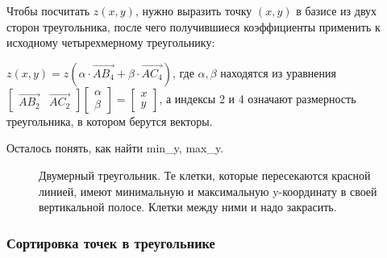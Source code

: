 \documentclass{article}
\begin{document}
Чтобы посчитать $z(x, y)$, нужно выразить точку $(x, y)$ в базисе из двух сторон треугольника, после чего получившиеся коэффициенты применить к исходному четырехмерному треугольнику:

$z(x, y) = z(\alpha \cdot \vec{AB_4} + \beta \cdot \vec{AC_4})$, где $\alpha, \beta$ находятся из уравнения $\begin{bmatrix}\vec{AB_2} & \vec{AC_2} \end{bmatrix} \begin{bmatrix} \alpha \\ \beta \end{bmatrix} = \begin{bmatrix} x \\ y \end{bmatrix}$, а индексы 2 и 4 означают размерность треугольника, в котором берутся векторы.


Осталось понять, как найти min\_y, max\_y.

\begin{center}
\begin{figure}[h]
\caption{Двумерный треугольник. Те клетки, которые пересекаются красной линией, имеют минимальную и максимальную y-координату в своей вертикальной полосе. Клетки между ними и надо закрасить.}
\label{ris:image}
\end{figure}\end{center}


\subsubsection{Сортировка точек в треугольнике}
\end{document}
